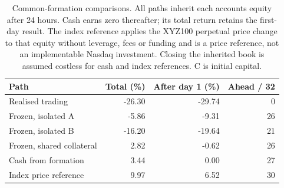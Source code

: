 \begin{table}[htbp]
\centering\small
\caption{Common-formation comparisons. All paths inherit each account\textquotesingle{}s equity after 24 hours. Cash earns zero thereafter; its total return retains the first-day result. The index reference applies the XYZ100 perpetual price change to that equity without leverage, fees or funding and is a price reference, not an implementable Nasdaq investment. Closing the inherited book is assumed costless for cash and index references. C is initial capital.}
\label{tab:feedbackbench}
\begin{tabular}{lrrr}
\toprule
Path & Total (\%) & After day 1 (\%) & Ahead / 32 \\
\midrule
Realised trading & -26.30 & -29.74 & 0 \\
Frozen, isolated A & -5.86 & -9.31 & 26 \\
Frozen, isolated B & -16.20 & -19.64 & 21 \\
Frozen, shared collateral & 2.82 & -0.62 & 26 \\
Cash from formation & 3.44 & 0.00 & 27 \\
Index price reference & 9.97 & 6.52 & 30 \\
\bottomrule
\end{tabular}
\end{table}
